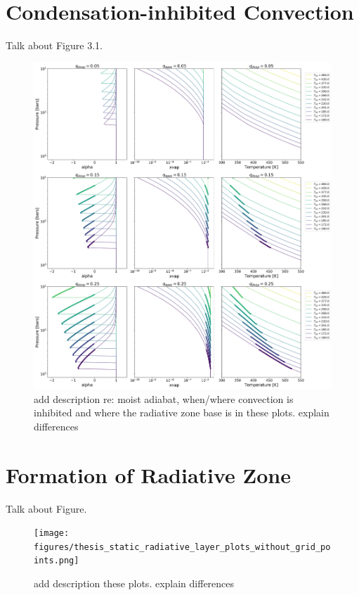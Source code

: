 \documentclass[11pt]{ucscthesisbs}
\begin{document}
\section{Condensation-inhibited Convection}
Talk about Figure 3.1.
\begin{figure}[ht!]
 \centerline{
  \includegraphics[width=7.0in]{figures/convection_inhibited_2.png}
 }
\caption[Inhibition of convection on Uranus]
{add description re: moist adiabat, when/where convection is inhibited and where the radiative zone base is in these plots. explain differences}
\label{fig:convection_inhibited}
\end{figure}



\section{Formation of Radiative Zone}
Talk about Figure.
\begin{figure}[ht]
 \centerline{
  \texttt{[image: figures/thesis\_static\_radiative\_layer\_plots\_without\_grid\_points.png]}
 }
\caption[Inhibition of convection on Uranus]
{add description these plots. explain differences}
\label{fig:radiative}
\end{figure}
\end{document}
